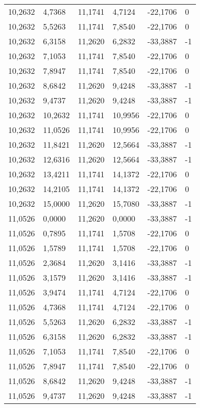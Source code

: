 \begin{longtable}{@{}llllll@{}}
		10,2632 & 4,7368  & 11,1741 & 4,7124  & -22,1706 & 0  \\
		10,2632 & 5,5263  & 11,1741 & 7,8540  & -22,1706 & 0  \\
		10,2632 & 6,3158  & 11,2620 & 6,2832  & -33,3887 & -1 \\
		10,2632 & 7,1053  & 11,1741 & 7,8540  & -22,1706 & 0  \\
		10,2632 & 7,8947  & 11,1741 & 7,8540  & -22,1706 & 0  \\
		10,2632 & 8,6842  & 11,2620 & 9,4248  & -33,3887 & -1 \\
		10,2632 & 9,4737  & 11,2620 & 9,4248  & -33,3887 & -1 \\
		10,2632 & 10,2632 & 11,1741 & 10,9956 & -22,1706 & 0  \\
		10,2632 & 11,0526 & 11,1741 & 10,9956 & -22,1706 & 0  \\
		10,2632 & 11,8421 & 11,2620 & 12,5664 & -33,3887 & -1 \\
		10,2632 & 12,6316 & 11,2620 & 12,5664 & -33,3887 & -1 \\
		10,2632 & 13,4211 & 11,1741 & 14,1372 & -22,1706 & 0  \\
		10,2632 & 14,2105 & 11,1741 & 14,1372 & -22,1706 & 0  \\
		10,2632 & 15,0000 & 11,2620 & 15,7080 & -33,3887 & -1 \\
		11,0526 & 0,0000  & 11,2620 & 0,0000  & -33,3887 & -1 \\
		11,0526 & 0,7895  & 11,1741 & 1,5708  & -22,1706 & 0  \\
		11,0526 & 1,5789  & 11,1741 & 1,5708  & -22,1706 & 0  \\
		11,0526 & 2,3684  & 11,2620 & 3,1416  & -33,3887 & -1 \\
		11,0526 & 3,1579  & 11,2620 & 3,1416  & -33,3887 & -1 \\
		11,0526 & 3,9474  & 11,1741 & 4,7124  & -22,1706 & 0  \\
		11,0526 & 4,7368  & 11,1741 & 4,7124  & -22,1706 & 0  \\
		11,0526 & 5,5263  & 11,2620 & 6,2832  & -33,3887 & -1 \\
		11,0526 & 6,3158  & 11,2620 & 6,2832  & -33,3887 & -1 \\
		11,0526 & 7,1053  & 11,1741 & 7,8540  & -22,1706 & 0  \\
		11,0526 & 7,8947  & 11,1741 & 7,8540  & -22,1706 & 0  \\
		11,0526 & 8,6842  & 11,2620 & 9,4248  & -33,3887 & -1 \\
		11,0526 & 9,4737  & 11,2620 & 9,4248  & -33,3887 & -1 \\

\end{longtable}
